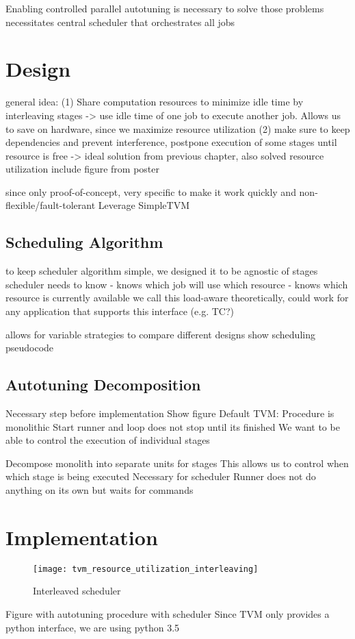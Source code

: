 Enabling controlled parallel autotuning is necessary to solve those problems
necessitates central scheduler that orchestrates all jobs

\section{Design}
general idea: 
(1) Share computation resources to minimize idle time by interleaving stages -> use idle time of one job to execute another job.
Allows us to save on hardware, since we maximize resource utilization
(2) make sure to keep dependencies and prevent interference, postpone execution of some stages until resource is free
-> ideal solution from previous chapter, also solved resource utilization
include figure from poster

since only proof-of-concept, very specific to make it work quickly and non-flexible/fault-tolerant
Leverage SimpleTVM

\subsection{Scheduling Algorithm}
to keep scheduler algorithm simple, we designed it to be agnostic of stages
scheduler needs to know
- knows which job will use which resource
- knows which resource is currently available
we call this load-aware
theoretically, could work for any application that supports this interface (e.g. TC?)

allows for variable strategies to compare different designs
show scheduling pseudocode

\subsection{Autotuning Decomposition}
Necessary step before implementation
Show figure
Default TVM:
Procedure is monolithic
Start runner and loop does not stop until its finished
We want to be able to control the execution of individual stages

Decompose monolith into separate units for stages
This allows us to control when which stage is being executed
Necessary for scheduler
Runner does not do anything on its own but waits for commands

\section{Implementation}
\begin{figure}[h]
	\centering
	\texttt{[image: tvm\_resource\_utilization\_interleaving]}%
	\caption{Interleaved scheduler}
	\label{fig:interleaving-scheduler}
\end{figure}
Figure with autotuning procedure with scheduler
Since TVM only provides a python interface, we are using python 3.5

